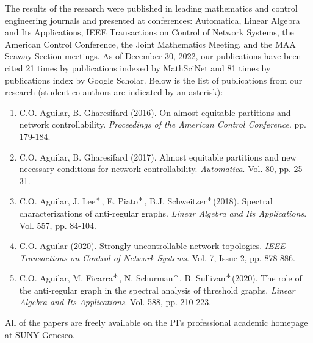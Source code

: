 \documentclass[11pt]{article}
\newcommand{\myast}{$^\text{\large\textasteriskcentered}$}
\begin{document}
The results of the research were published in leading mathematics and control engineering journals and presented at conferences: Automatica, Linear Algebra and Its Applications, IEEE Transactions on Control of Network Systems, the American Control Conference, the Joint Mathematics Meeting, and the MAA Seaway Section meetings.  As of December 30, 2022, our publications have been cited 21 times by publications indexed by MathSciNet and 81 times by publications index by Google Scholar.  Below is the list of publications from our research (student co-authors are indicated by an asterisk):
\begin{enumerate}
\item C.O. Aguilar, B. Gharesifard (2016). On almost equitable partitions and network controllability. {\em Proceedings of the American Control Conference}. pp. 179-184.
\item C.O. Aguilar, B. Gharesifard (2017). Almost equitable partitions and new necessary conditions for network controllability. {\em Automatica}. Vol. 80, pp. 25-31.
\item C.O. Aguilar, J. Lee\myast, E. Piato\myast, B.J. Schweitzer\myast (2018). Spectral characterizations of anti-regular graphs. \textit{Linear Algebra and Its Applications}. Vol. 557, pp. 84-104.
\item C.O. Aguilar (2020). Strongly uncontrollable network topologies. \textit{IEEE Transactions on Control of Network Systems}. Vol. 7, Issue 2, pp. 878-886.
\item C.O. Aguilar, M. Ficarra\myast, N. Schurman\myast, B. Sullivan\myast (2020). The role of the anti-regular graph in the spectral analysis of threshold graphs. \textit{Linear Algebra and Its Applications}. Vol. 588, pp. 210-223.
\end{enumerate}
All of the papers are freely available on the PI's professional academic homepage at SUNY Geneseo.
\end{document}
